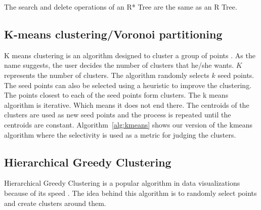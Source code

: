 The search and delete operations of an R* Tree are the same as an R Tree.

\subsection{K-means clustering/Voronoi partitioning}
K means clustering is an algorithm designed to cluster a group of points \citep{macqueen1967some}. As the name suggests, the user decides the number of clusters that he/she wants. $K$ represents the number of clusters. The algorithm randomly selects $k$ seed points. The seed points can also be selected using a heuristic to improve the clustering. The points closest to each of the seed points form clusters. The k means algorithm is iterative. Which means it does not end there. The centroids of the clusters are used as new seed points and the process is repeated until the centroids are constant. Algorithm~\ref{alg:kmeans} shows our version of the kmeans algorithm where the selectivity is used as a metric for judging the clusters.




\subsection{Hierarchical Greedy Clustering}
Hierarchical Greedy Clustering is a popular algorithm in data visualizations because of its speed \citep{hgclustering}. The idea behind this algorithm is to randomly select points and create clusters around them.


